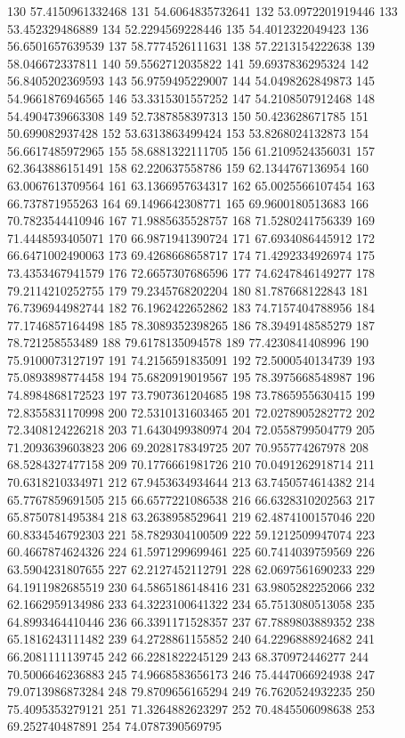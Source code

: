 {130 57.4150961332468
131 54.6064835732641
132 53.0972201919446
133 53.452329486889
134 52.2294569228446
135 54.4012322049423
136 56.6501657639539
137 58.7774526111631
138 57.2213154222638
139 58.046672337811
140 59.5562712035822
141 59.6937836295324
142 56.8405202369593
143 56.9759495229007
144 54.0498262849873
145 54.9661876946565
146 53.3315301557252
147 54.2108507912468
148 54.4904739663308
149 52.7387858397313
150 50.423628671785
151 50.699082937428
152 53.6313863499424
153 53.8268024132873
154 56.6617485972965
155 58.6881322111705
156 61.2109524356031
157 62.3643886151491
158 62.220637558786
159 62.1344767136954
160 63.0067613709564
161 63.1366957634317
162 65.0025566107454
163 66.737871955263
164 69.1496642308771
165 69.9600180513683
166 70.7823544410946
167 71.9885635528757
168 71.5280241756339
169 71.4448593405071
170 66.9871941390724
171 67.6934086445912
172 66.6471002490063
173 69.4268668658717
174 71.4292334926974
175 73.4353467941579
176 72.6657307686596
177 74.6247846149277
178 79.2114210252755
179 79.2345768202204
180 81.787668122843
181 76.7396944982744
182 76.1962422652862
183 74.7157404788956
184 77.1746857164498
185 78.3089352398265
186 78.3949148585279
187 78.721258553489
188 79.6178135094578
189 77.4230841408996
190 75.9100073127197
191 74.2156591835091
192 72.5000540134739
193 75.0893898774458
194 75.6820919019567
195 78.3975668548987
196 74.8984868172523
197 73.7907361204685
198 73.7865955630415
199 72.8355831170998
200 72.5310131603465
201 72.0278905282772
202 72.3408124226218
203 71.6430499380974
204 72.0558799504779
205 71.2093639603823
206 69.2028178349725
207 70.955774267978
208 68.5284327477158
209 70.1776661981726
210 70.0491262918714
211 70.6318210334971
212 67.9453634934644
213 63.7450574614382
214 65.7767859691505
215 66.6577221086538
216 66.6328310202563
217 65.8750781495384
218 63.2638958529641
219 62.4874100157046
220 60.8334546792303
221 58.7829304100509
222 59.1212509947074
223 60.4667874624326
224 61.5971299699461
225 60.7414039759569
226 63.5904231807655
227 62.2127452112791
228 62.0697561690233
229 64.1911982685519
230 64.5865186148416
231 63.9805282252066
232 62.1662959134986
233 64.3223100641322
234 65.7513080513058
235 64.8993464410446
236 66.3391171528357
237 67.7889803889352
238 65.1816243111482
239 64.2728861155852
240 64.2296888924682
241 66.2081111139745
242 66.2281822245129
243 68.370972446277
244 70.5006646236883
245 74.9668583656173
246 75.4447066924938
247 79.0713986873284
248 79.8709656165294
249 76.7620524932235
250 75.4095353279121
251 71.3264882623297
252 70.4845506098638
253 69.252740487891
254 74.0787390569795
}
